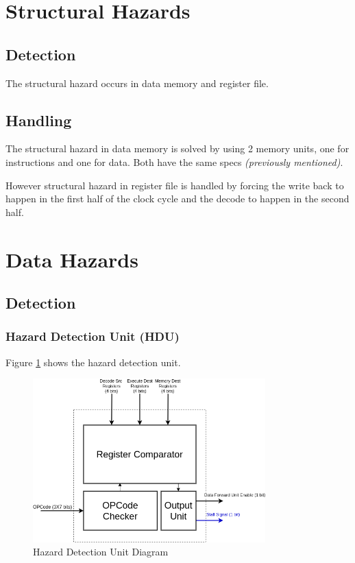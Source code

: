 \documentclass[12pt]{report}
\begin{document}
\section{Structural Hazards}

\subsection{Detection}
The structural hazard occurs in data memory and register file.

\subsection{Handling}
The structural hazard in data memory is solved by using 2 memory units, one for instructions and one for data. Both have the same specs \emph{(previously mentioned)}.

However structural hazard in register file is handled by forcing the write back to happen in the first half of the clock cycle and the decode to happen in the second half.

\section{Data Hazards}

\subsection{Detection}
\subsubsection{Hazard Detection Unit (HDU)}
Figure \ref{fig:hdu} shows the hazard detection unit.
\begin{figure}[hp]
    \centering
    \includegraphics[width=0.8\textwidth]{hdu}
    \caption{Hazard Detection Unit Diagram}
    \label{fig:hdu}
\end{figure}
\end{document}
